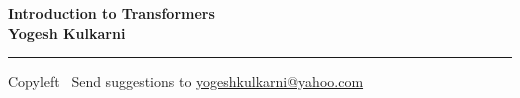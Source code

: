 
\graphicspath{{images/}}

\footnotesize


\begin{center}
\Large{\textbf{Introduction to Transformers\\ Yogesh Kulkarni}}  
\end{center}

\begin{multicols}{2}

\end{multicols}

\rule{\linewidth}{0.25pt}
\scriptsize
Copyleft \textcopyleft\  Send suggestions to 
\href{http://www.yogeshkulkarni.com}{yogeshkulkarni@yahoo.com}



